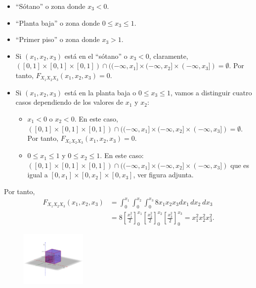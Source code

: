 \documentclass[
  letterpaper,
  DIV=11,
  numbers=noendperiod]{scrreprt}
\providecommand{\tightlist}{%
  \setlength{\itemsep}{0pt}\setlength{\parskip}{0pt}}\usepackage{longtable,booktabs,array}
\begin{document}
\begin{itemize}
\item
  ``Sótano'' o zona donde \(x_3<0\).
\item
  ``Planta baja'' o zona donde \(0\leq x_3\leq 1\).
\item
  ``Primer piso'' o zona donde \(x_3>1\).
\item
  Si \((x_1,x_2,x_3)\) está en el ``sótano'' o \(x_3<0\), claramente,
  \(([0,1]\times [0,1]\times [0,1])\cap ((-\infty,x_1]\times (-\infty,x_2]\times (-\infty,x_3])=\emptyset\).
  Por tanto, \(F_{X_1X_2X_3}(x_1,x_2,x_3)=0\).
\item
  Si \((x_1,x_2,x_3)\) está en la planta baja o \(0\leq x_3\leq 1\),
  vamos a distinguir cuatro casos dependiendo de los valores de \(x_1\)
  y \(x_2\):

  \begin{itemize}
  \tightlist
  \item
    \(x_1 <0\) o \(x_2 <0\). En este caso,
    \(([0,1]\times [0,1]\times [0,1])\cap ((-\infty,x_1]\times (-\infty,x_2]\times (-\infty,x_3])=\emptyset\).
    Por tanto, \(F_{X_1X_2X_3}(x_1,x_2,x_3)=0\).
  \item
    \(0\leq x_1\leq 1\) y \(0\leq x_2\leq 1\). En este caso:
    \(([0,1]\times [0,1]\times [0,1])\cap ((-\infty,x_1]\times (-\infty,x_2]\times (-\infty,x_3])\)
    que es igual a \([0,x_1]\times [0,x_2]\times [0,x_3]\), ver figura
    adjunta.
  \end{itemize}
\end{itemize}

Por tanto, \[
\begin{array}{rl}
F_{X_1X_2X_3}(x_1,x_2,x_3) & =\int_{0}^{x_1}\int_{0}^{x_2}\int_{0}^{x_3} 8 x_1 x_2 x_3 dx_1\, dx_2\ dx_3\\
& = 8\left[\frac{x_1^2}{2}\right]_0^{x_1}\left[\frac{x_2^2}{2}\right]_0^{x_2}\left[\frac{x_3^2}{2}\right]_0^{x_3} = x_1^2 x_2^2 x_3^2.
\end{array}
\]

\begin{figure}

{\centering \includegraphics[width=1.25in,height=\textheight]{Images/Fx1x2x3bajos.png}

}

\end{figure}
\end{document}

